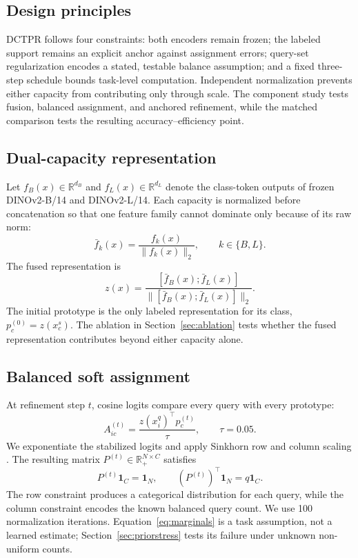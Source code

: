 \documentclass[]{spie}
\newcommand{\method}{\textsc{DCTPR}\xspace}
\begin{document}
\subsection{Design principles}

\method follows four constraints: both encoders remain frozen; the labeled
support remains an explicit anchor against assignment errors; query-set
regularization encodes a stated, testable balance assumption; and a fixed
three-step schedule bounds task-level computation. Independent normalization
prevents either capacity from contributing only through scale. The component
study tests fusion, balanced assignment, and anchored refinement, while the
matched comparison tests the resulting accuracy--efficiency point.

\subsection{Dual-capacity representation}

Let $f_B(x)\in\mathbb{R}^{d_B}$ and
$f_L(x)\in\mathbb{R}^{d_L}$ denote the class-token outputs of frozen DINOv2-B/14
and DINOv2-L/14. Each capacity is normalized before concatenation so that one
feature family cannot dominate only because of its raw norm:
\begin{equation}
 \bar f_k(x)=\frac{f_k(x)}{\lVert f_k(x)\rVert_2},\qquad k\in\{B,L\}.
\end{equation}
The fused representation is
\begin{equation}
 z(x)=\frac{[\bar f_B(x);\bar f_L(x)]}
 {\lVert[\bar f_B(x);\bar f_L(x)]\rVert_2}.
 \label{eq:fusion}
\end{equation}
The initial prototype is the only labeled representation for its class,
$p_c^{(0)}=z(x_c^s)$. The ablation in Section~\ref{sec:ablation} tests whether
the fused representation contributes beyond either capacity alone.

\subsection{Balanced soft assignment}

At refinement step $t$, cosine logits compare every query with every prototype:
\begin{equation}
 A_{ic}^{(t)}=\frac{z(x_i^q)^\top p_c^{(t)}}{\tau},
 \qquad \tau=0.05.
 \label{eq:logits}
\end{equation}
We exponentiate the stabilized logits and apply Sinkhorn row and column scaling
\cite{sinkhorn}. The resulting matrix $P^{(t)}\in\mathbb{R}_+^{N\times C}$
satisfies
\begin{equation}
 P^{(t)}\mathbf{1}_{C}=\mathbf{1}_{N},\qquad
 (P^{(t)})^\top\mathbf{1}_{N}=q\mathbf{1}_{C}.
 \label{eq:marginals}
\end{equation}
The row constraint produces a categorical distribution for each query, while
the column constraint encodes the known balanced query count. We use 100
normalization iterations. Equation~\eqref{eq:marginals} is a task assumption,
not a learned estimate; Section~\ref{sec:priorstress} tests its failure under
unknown non-uniform counts.
\end{document}
